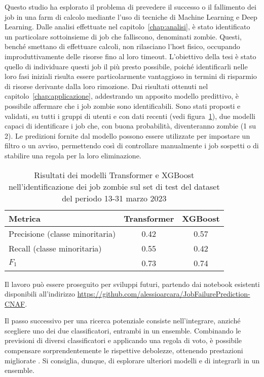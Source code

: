 \label{chap:conclusione}

Questo studio ha esplorato il problema di prevedere il successo o il
fallimento dei job in una farm di calcolo mediante l'uso di tecniche di
Machine Learning e Deep Learning. Dalle analisi effettuate nel
capitolo~\ref{chap:analisi}, è stato identificato un particolare sottoinsieme
di job che falliscono, denominati zombie. Questi, benché smettano di
effettuare calcoli, non rilasciano l'host fisico, occupando improduttivamente
delle risorse fino al loro timeout. L'obiettivo della tesi è stato quello di
individuare questi job il più presto possibile, poiché identificarli nelle
loro fasi iniziali risulta essere particolarmente vantaggioso in termini di
risparmio di risorse derivante dalla loro rimozione. Dai risultati ottenuti
nel capitolo~\ref{chap:applicazione}, addestrando un apposito modello
predittivo, è possibile affermare che i job zombie sono identificabili. Sono
stati proposti e validati, su tutti i gruppi di utenti e con dati recenti
(vedi figura~\ref{table:model_results}), due modelli capaci di identificare i
job che, con buona probabilità, diventeranno zombie (1 su 2). Le predizioni
fornite dal modello possono essere utilizzate per impostare un filtro o un
avviso, permettendo così di controllare manualmente i job sospetti o di
stabilire una regola per la loro eliminazione.

\begin{table}[!ht]
    \centering
    \begin{tabular}{lcc}
        \toprule
        Metrica & Transformer & XGBoost \\ 
        \midrule
        Precisione (classe minoritaria) & 0.42 & 0.57 \\ 
        Recall (classe minoritaria) & 0.55 & 0.42 \\ 
        $F_1$ & 0.73 & 0.74 \\ 
        \bottomrule
    \end{tabular}
    \caption{\small Risultati dei modelli Transformer e XGBoost nell'identificazione
    dei job zombie sul set di test del dataset del periodo 13-31 marzo 2023}
    \label{table:model_results}
\end{table}

Il lavoro può essere proseguito per sviluppi futuri, partendo dai notebook
esistenti disponibili all'indirizzo
\url{https://github.com/alessioarcara/JobFailurePrediction-CNAF}.

Il passo successivo per una ricerca potenziale consiste nell'integrare,
anziché scegliere uno dei due classificatori, entrambi in un ensemble.
Combinando le previsioni di diversi classificatori e applicando una regola di
voto, è possibile compensare sorprendentemente le rispettive debolezze,
ottenendo prestazioni migliorate \cite{geron2019}. Si consiglia, dunque, di
esplorare ulteriori modelli e di integrarli in un ensemble.

